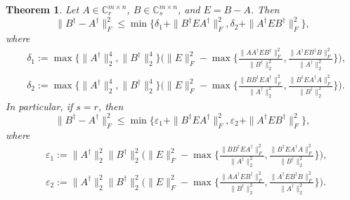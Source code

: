 \documentclass[11pt]{article}
\newtheorem{theorem}{Theorem}[section]
\begin{document}
\begin{theorem}\label{up-thm2}
Let $A\in\mathbb{C}^{m\times n}_{r}$, $B\in\mathbb{C}^{m\times n}_{s}$, and $E=B-A$. Then
\begin{equation}\label{up2.1}
\|B^{\dagger}-A^{\dagger}\|_{F}^{2}\leq\min\big\{\delta_{1}+\|B^{\dagger}EA^{\dagger}\|_{F}^{2}, \delta_{2}+\|A^{\dagger}EB^{\dagger}\|_{F}^{2}\big\},
\end{equation}
where
\begin{align*}
&\delta_{1}:=\max\big\{\|A^{\dagger}\|_{2}^{4},\|B^{\dagger}\|_{2}^{4}\big\}\bigg(\|E\|_{F}^{2}-\max\bigg\{\frac{\|AA^{\dagger}EB^{\dagger}\|_{F}^{2}}{\|B^{\dagger}\|_{2}^{2}},\frac{\|A^{\dagger}EB^{\dagger}B\|_{F}^{2}}{\|A^{\dagger}\|_{2}^{2}}\bigg\}\bigg),\\
&\delta_{2}:=\max\big\{\|A^{\dagger}\|_{2}^{4},\|B^{\dagger}\|_{2}^{4}\big\}\bigg(\|E\|_{F}^{2}-\max\bigg\{\frac{\|BB^{\dagger}EA^{\dagger}\|_{F}^{2}}{\|A^{\dagger}\|_{2}^{2}},\frac{\|B^{\dagger}EA^{\dagger}A\|_{F}^{2}}{\|B^{\dagger}\|_{2}^{2}}\bigg\}\bigg).
\end{align*}
In particular, if $s=r$, then
\begin{equation}\label{up2.2}
\|B^{\dagger}-A^{\dagger}\|_{F}^{2}\leq\min\big\{\varepsilon_{1}+\|B^{\dagger}EA^{\dagger}\|_{F}^{2}, \varepsilon_{2}+\|A^{\dagger}EB^{\dagger}\|_{F}^{2}\big\},
\end{equation}
where
\begin{align*}
&\varepsilon_{1}:=\|A^{\dagger}\|_{2}^{2}\|B^{\dagger}\|_{2}^{2}\bigg(\|E\|_{F}^{2}-\max\bigg\{\frac{\|BB^{\dagger}EA^{\dagger}\|_{F}^{2}}{\|A^{\dagger}\|_{2}^{2}},\frac{\|B^{\dagger}EA^{\dagger}A\|_{F}^{2}}{\|B^{\dagger}\|_{2}^{2}}\bigg\}\bigg),\\
&\varepsilon_{2}:=\|A^{\dagger}\|_{2}^{2}\|B^{\dagger}\|_{2}^{2}\bigg(\|E\|_{F}^{2}-\max\bigg\{\frac{\|AA^{\dagger}EB^{\dagger}\|_{F}^{2}}{\|B^{\dagger}\|_{2}^{2}},\frac{\|A^{\dagger}EB^{\dagger}B\|_{F}^{2}}{\|A^{\dagger}\|_{2}^{2}}\bigg\}\bigg).
\end{align*}
\end{theorem}
\end{document}
